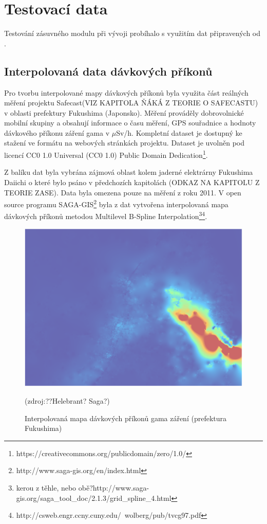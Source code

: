 \section{Testovací data}
Testování zásuvného modulu při vývoji probíhalo s využitím dat připravených od .

\subsection{Interpolovaná data dávkových příkonů}
Pro tvorbu interpolované mapy dávkových příkonů byla využita část reálných měření projektu Safecast(VIZ KAPITOLA ŇÁKÁ Z TEORIE O SAFECASTU)
v oblasti prefektury Fukushima (Japonsko). Měření prováděly dobrovolnické mobilní skupiny a obsahují informace o času měření, GPS souřadnice a hodnoty dávkového příkonu záření gama v $\mu$Sv/h. Kompletní dataset je dostupný ke stažení ve formátu  na webových stránkách projektu. Dataset je uvolněn pod licencí CC0 1.0 Universal (CC0 1.0) Public Domain Dedication\footnote{https://creativecommons.org/publicdomain/zero/1.0/}. 

Z balíku dat byla vybrána zájmová oblast kolem jaderné elektrárny Fukushima Daiichi o které bylo psáno v předchozích kapitolách (ODKAZ NA KAPITOLU Z TEORIE ZASE). Data byla omezena pouze na měření z roku 2011. V open source programu SAGA-GIS\footnote{http://www.saga-gis.org/en/index.html} byla z dat vytvořena interpolovaná mapa dávkových příkonů metodou Multilevel B-Spline Interpolation\footnote{kerou z těhle, nebo obě?http://www.saga-gis.org/saga\_tool\_doc/2.1.3/grid\_spline\_4.html}\footnote{http://csweb.engr.ccny.cuny.edu/~wolberg/pub/tvcg97.pdf}. 

\begin{figure}[H]
    \centering
    \includegraphics[scale=0.4]{./pictures/interpolovana_mapa.png}
      	\caption[Interpolovaná mapa dávkových příkonů gama záření (prefektura Fukushima)]{Interpolovaná mapa dávkových příkonů gama záření (prefektura Fukushima)}(zdroj:??Helebrant? Saga?)
    	\label{fig:interpolatedMap}
\end{figure} 

